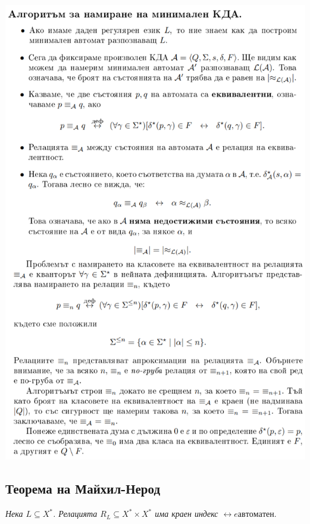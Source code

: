 \documentclass[11pt]{article} %
\begin{document}
\includegraphics[scale=0.8]{MinKDAAlg.png}

\subsection{Теорема на Майхил-Нерод}
\emph{Нека $L \subseteq X^{*}$. Релацията $R_{L} \subseteq X^{*} \times X^{*}$ има краен индекс $\leftrightarrow e автоматен$}.
\end{document}
